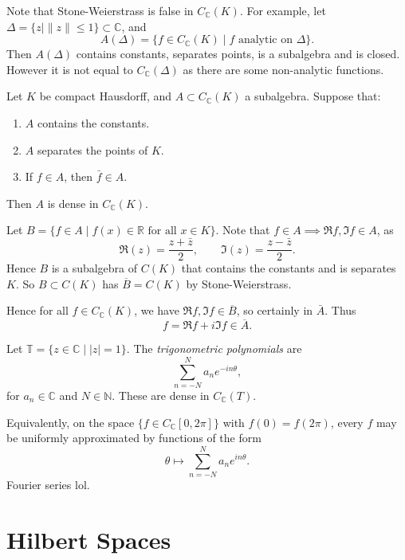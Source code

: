 \documentclass[12pt]{article}
\begin{document}
Note that Stone-Weierstrass is false in $C_{\mathbb{C}}(K)$. For example, let $\Delta = \{z \mid \|z\| \leq 1\} \subset \mathbb{C}$, and
\[
	A(\Delta) = \{f \in C_{\mathbb{C}}(K) \mid f \text{ analytic  on } \Delta\}.
\]
Then $A(\Delta)$ contains constants, separates points, is a subalgebra and is closed. However it is not equal to $C_{\mathbb{C}}(\Delta)$ as there are some non-analytic functions.

\begin{theorem}
	Let $K$ be compact Hausdorff, and $A \subset C_{\mathbb{C}}(K)$ a subalgebra. Suppose that:
	\begin{enumerate}[\normalfont(i)]
		\item $A$ contains the constants.
		\item $A$ separates the points of $K$.
		\item If $f \in A$, then $\bar f \in A$.
	\end{enumerate}
	Then $A$ is dense in $C_{\mathbb{C}}(K)$.
\end{theorem}

\begin{proofbox}
	Let $B = \{f \in A \mid f(x) \in \mathbb{R} \text{ for all } x \in K\}$. Note that $f \in A \implies \Re f, \Im f \in A$, as
	\[
	\Re (z) = \frac{z + \bar z}{2}, \qquad \Im(z) = \frac{z - \bar z}{2}.
	\]
	Hence $B$ is a subalgebra of $C(K)$ that contains the constants and is separates $K$. So $B \subset C(K)$ has $\overline{B} = C(K)$ by Stone-Weierstrass.

	Hence for all $f \in C_{\mathbb{C}}(K)$, we have $\Re f, \Im f \in \overline{B}$, so certainly in $\bar A$. Thus
	\[
	f = \Re f + i \Im f \in \overline{A}.
	\]
\end{proofbox}

\begin{exbox}
	Let $\mathbb{T} = \{z \in \mathbb{C} \mid |z| = 1\}$. The \emph{trigonometric polynomials} are
	\[
	\sum_{n = -N}^{N} a_n e^{-in \theta},
	\]
	for $a_n \in \mathbb{C}$ and $N \in \mathbb{N}$. These are dense in $C_{\mathbb{C}}(T)$.

Equivalently, on the space $\{f \in C_{\mathbb{C}}[0, 2\pi]\}$ with $f(0) = f(2\pi)$, every $f$ may be uniformly approximated by functions of the form
\[
\theta \mapsto \sum_{n = -N}^{N} a_n e^{in \theta}.
\]
Fourier series lol.
\end{exbox}


\newpage

\section{Hilbert Spaces}
\label{sec:hilbert}
\end{document}
